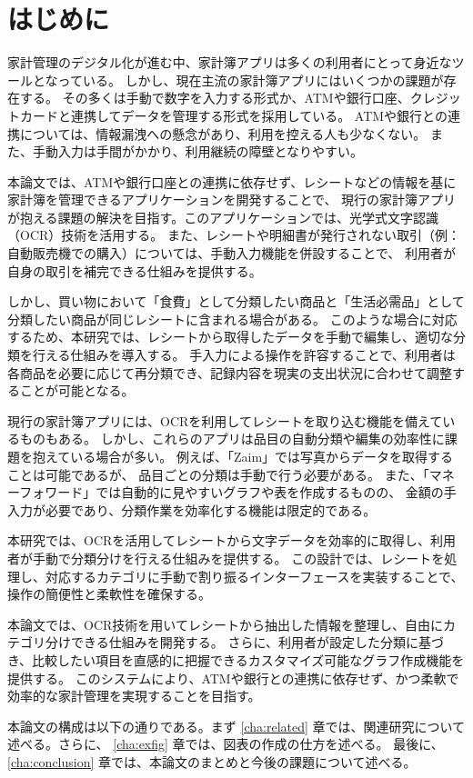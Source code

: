 \documentclass[main]{subfiles}
\begin{document}
\chapter{はじめに}
\label{cha:intro}

家計管理のデジタル化が進む中、家計簿アプリは多くの利用者にとって身近なツールとなっている。
しかし、現在主流の家計簿アプリにはいくつかの課題が存在する。
その多くは手動で数字を入力する形式か、ATMや銀行口座、クレジットカードと連携してデータを管理する形式を採用している。
ATMや銀行との連携については、情報漏洩への懸念があり、利用を控える人も少なくない。
また、手動入力は手間がかかり、利用継続の障壁となりやすい。

本論文では、ATMや銀行口座との連携に依存せず、レシートなどの情報を基に家計簿を管理できるアプリケーションを開発することで、
現行の家計簿アプリが抱える課題の解決を目指す。このアプリケーションでは、光学式文字認識（OCR）技術を活用する。
また、レシートや明細書が発行されない取引（例：自動販売機での購入）については、手動入力機能を併設することで、
利用者が自身の取引を補完できる仕組みを提供する。

しかし、買い物において「食費」として分類したい商品と「生活必需品」として分類したい商品が同じレシートに含まれる場合がある。
このような場合に対応するため、本研究では、レシートから取得したデータを手動で編集し、適切な分類を行える仕組みを導入する。
手入力による操作を許容することで、利用者は各商品を必要に応じて再分類でき、記録内容を現実の支出状況に合わせて調整することが可能となる。

現行の家計簿アプリには、OCRを利用してレシートを取り込む機能を備えているものもある。
しかし、これらのアプリは品目の自動分類や編集の効率性に課題を抱えている場合が多い。
例えば、「Zaim」では写真からデータを取得することは可能であるが、
品目ごとの分類は手動で行う必要がある。
また、「マネーフォワード」では自動的に見やすいグラフや表を作成するものの、
金額の手入力が必要であり、分類作業を効率化する機能は限定的である。

本研究では、OCRを活用してレシートから文字データを効率的に取得し、利用者が手動で分類分けを行える仕組みを提供する。
この設計では、レシートを処理し、対応するカテゴリに手動で割り振るインターフェースを実装することで、操作の簡便性と柔軟性を確保する。

本論文では、OCR技術を用いてレシートから抽出した情報を整理し、自由にカテゴリ分けできる仕組みを開発する。
さらに、利用者が設定した分類に基づき、比較したい項目を直感的に把握できるカスタマイズ可能なグラフ作成機能を提供する。
このシステムにより、ATMや銀行との連携に依存せず、かつ柔軟で効率的な家計管理を実現することを目指す。

本論文の構成は以下の通りである。まず \ref{cha:related} 章では、関連研究について述べる。さらに、
\ref{cha:exfig} 章では、図表の作成の仕方を述べる。
最後に、\ref{cha:conclusion} 章では、本論文のまとめと今後の課題について述べる。
\end{document}
